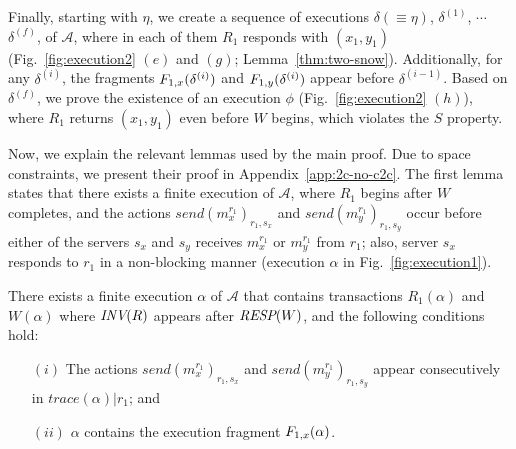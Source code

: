    Finally, starting with  $\eta$, we create a sequence of executions $\delta (\equiv \eta)$, $\delta^{(1)}$, $\cdots$ $\delta^{(f)}$, of $\mathcal{A}$, 
     where in each of them $R_1$ responds with $(x_1, y_1)$  (Fig.~\ref{fig:execution2} $(e)$ and $(g)$; Lemma~\ref{thm:two-snow}). Additionally,  for any $\delta^{(i)}$, the fragments   ${ F_{1,x}(\delta^{(i)})}$ and
    ${ F_{1,y}(\delta^{(i)})}$  appear before $\delta^{(i-1)}$.
    Based on $\delta^{(f)}$, we prove the existence of an execution $\phi$ (Fig.~\ref{fig:execution2} $(h)$), where $R_1$ returns 
    $(x_1, y_1)$ even before $W$ begins, which violates the $S$ property.

  
  Now, we explain the relevant lemmas used by the main proof. Due to space constraints, we present their proof in Appendix~\ref{app:2c-no-c2c}. The first lemma states that there exists a finite execution of ${\mathcal A}$, where $R_1$ begins after  
  $W$ completes, and the actions $send(m_x^{r_1})_{r_1, s_x}$ and $send(m_y^{r_1})_{r_1, s_y}$  occur 
before either of the servers $s_x$ and  $s_y$ 
  receives $m_x^{r_1}$ or $m_y^{r_1}$ from $r_1$;  also,  server $s_x$ responds to $r_1$ in a non-blocking manner (execution $\alpha$ in Fig.~\ref{fig:execution1}).  
\begin{lemma}\label{lem:exec_alpha} 
There exists a finite execution $\alpha$ of $\mathcal{A}$ that contains transactions $R_1(\alpha)$  
 and $W(\alpha)$ where ${\textit{INV}(R)}$ appears after ${\textit{RESP}(W)}$, and the following conditions hold:
\begin{enumerate}
\item[$(i)$] The actions $send(m_x^{r_1})_{r_1, s_x}$ and  $send(m_y^{r_1})_{r_1, s_y}$ appear consecutively in $trace(\alpha)|r_1$; and 
\item[$(ii)$]   $\alpha$ contains the execution fragment  ${ F_{1,x}(\alpha)}$.
\end{enumerate} 
\end{lemma}

